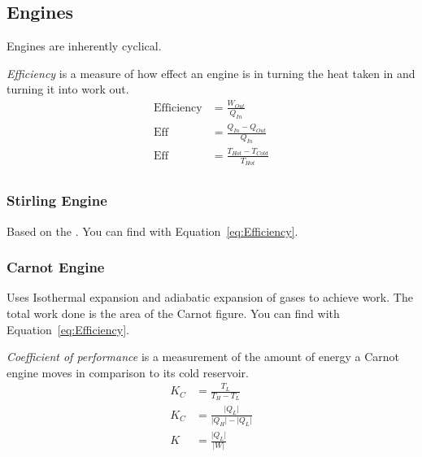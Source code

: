 \subsection{Engines}\label{subsec:Engines}
Engines are inherently cyclical.
\begin{definition}[Efficiency]\label{def:Efficiency}
  \emph{Efficiency} is a measure of how effect an engine is in turning the heat taken in and turning it into work out.
  \begin{equation}\label{eq:Efficiency}
    \begin{aligned}
      \text{Efficiency} &= \frac{W_{Out}}{Q_{In}} \\
      \text{Eff} &= \frac{Q_{In}-Q_{Out}}{Q_{In}} \\
      \text{Eff} &= \frac{T_{Hot}-T_{Cold}}{T_{Hot}} \\
    \end{aligned}
  \end{equation}
\end{definition}

\subsubsection{Stirling Engine}\label{subsubsec:Stirling Engine}
Based on the .
You can find  with Equation~\eqref{eq:Efficiency}.

\subsubsection{Carnot Engine}\label{subsubsec:Carnot Engine}
Uses Isothermal expansion and adiabatic expansion of gases to achieve work.
The total work done is the area of the Carnot figure.
You can find  with Equation~\eqref{eq:Efficiency}.

\begin{definition}\label{def:Coefficient of Performance}
  \emph{Coefficient of performance} is a measurement of the amount of energy a Carnot engine moves in comparison to its cold reservoir.
  \begin{equation}\label{eq:Coefficient of Performance}
    \begin{aligned}
      K_{C} &= \frac{T_{L}}{T_{H} - T_{L}} \\
      K_{C} &= \frac{\lvert Q_{L} \rvert}{\lvert Q_{H} \rvert - \lvert Q_{L} \rvert} \\
      K &= \frac{\lvert Q_{L} \rvert}{\lvert W \rvert} \\
    \end{aligned}
  \end{equation}
\end{definition}